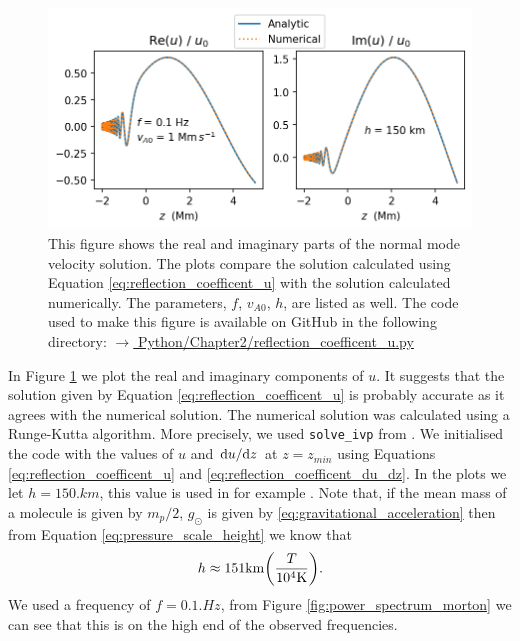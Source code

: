 \begin{figure}
    \centering
    \vspace{-20pt}
    \includegraphics[width=\textwidth]{figures/chapter02/reflection_coefficent_u.png}
    \vspace{-20pt}
    \caption{This figure shows the real and imaginary parts of the normal mode velocity solution. The plots compare the solution calculated using Equation \eqref{eq:reflection_coefficent_u} with the solution calculated numerically. The parameters, $f$, $v_{A0}$, $h$, are listed as well. The code used to make this figure is available on GitHub in the following directory:\newline
    \href{https://github.com/aleksyprok/apkp_thesis/blob/main/Python/Chapter2/reflection_coefficent_u.py}{$\rightarrow$ Python/Chapter2/reflection\_coefficent\_u.py}}
    \vspace{-10pt}
    \label{fig:reflection_coefficent_u}
\end{figure}

In Figure \ref{fig:reflection_coefficent_u} we plot the real and imaginary components of $u$. It suggests that the solution given by Equation \eqref{eq:reflection_coefficent_u} is probably accurate as it agrees with the numerical solution. The numerical solution was calculated using a Runge-Kutta algorithm. More precisely, we used \texttt{solve\_ivp} from \citet{SciPy2020}. We initialised the code with the values of $u$ and $\dv*{u}{z}$ at $z=z_{min}$ using Equations \eqref{eq:reflection_coefficent_u} and \eqref{eq:reflection_coefficent_du_dz}. In the plots we let $h=150\si{.km}$, this value is used in for example \citet{Hollweg1984b}. Note that, if the mean mass of a molecule is given by $m_p/2$, $g_\odot$ is given by \eqref{eq:gravitational_acceleration} then from Equation \eqref{eq:pressure_scale_height} we know that
\[h \approx 151\si{.km}\qty(\frac{T}{10^4\si{.K}}).\]
We used a frequency of $f=0.1\si{.Hz}$, from Figure \ref{fig:power_spectrum_morton} we can see that this is on the high end of the observed frequencies.


